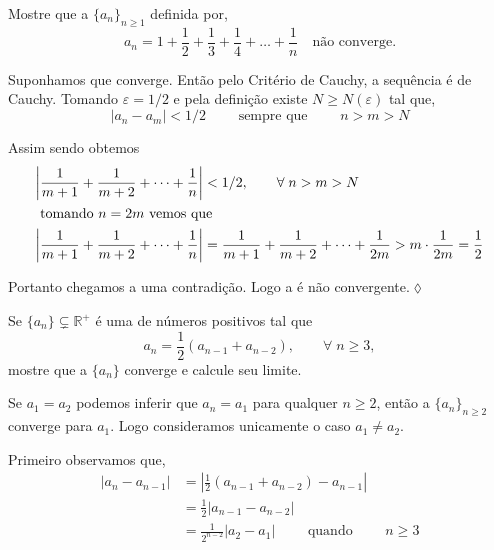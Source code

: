 \begin{exer}
Mostre que a \seq $\{a_n\}_{n\geq 1}$ definida por,
\begin{equation*}
a_n=1+\frac{1}{2}+\frac{1}{3}+\frac{1}{4}+\ldots+\frac{1}{n} \quad \text{n\~{a}o converge.}
\end{equation*}

\end{exer}

\solo Suponhamos que converge. Ent\~{a}o  pelo Crit\'{e}rio de Cauchy, a
sequ\^{e}ncia \'{e} de Cauchy. Tomando $\varepsilon=1/2$ e pela defini\c{c}\~{a}o existe $N\geq N(\varepsilon)$ tal que,
\begin{equation*}
  |a_n-a_m|<1/2\qquad \text{ sempre que }\qquad  n>m>N
\end{equation*}

 Assim sendo obtemos
\begin{align*}
\left|\frac{1}{m+1}+\frac{1}{m+2}+\cdots+\frac{1}{n}\right| &< 1/2,\qquad \forall \; n>m>N\\
   \intertext{ tomando $n=2m$ vemos que }
\left|\frac{1}{m+1}+\frac{1}{m+2}+\cdots+\frac{1}{n}\right|
&=\frac{1}{m+1}+\frac{1}{m+2}+\cdots+\frac{1}{2m}>m\cdot\frac{1}{2m}=\frac{1}{2}
\end{align*}

Portanto chegamos a uma contradi\c{c}\~{a}o. Logo a \seq  \'{e} n\~{a}o
convergente.\hfill \(\lozenge\)

\begin{exer}
Se $\{a_n\}\subsetneq \mathbb{R}^{+}$ \'{e} uma \seq de n\'{u}meros positivos
tal que
\begin{equation*}
  a_n=\frac{1}{2}(a_{n-1}+a_{n-2}), \qquad \forall\; n\geq 3,
\end{equation*}
mostre que a \seq $\{a_n\}$ converge e calcule seu limite.
\end{exer}

\solo Se $a_1=a_2$ podemos inferir que $a_n=a_1$ para qualquer
$n\geq 2$, ent\~{a}o a \seq $\{a_n\}_{n\geq 2}$ converge para $a_1$.
Logo consideramos unicamente o caso $a_1\neq a_2$.

Primeiro observamos que,
\begin{align}
 |a_n-a_{n-1}| &=\left|\frac{1}{2}(a_{n-1}+a_{n-2})-a_{n-1}\right|\nonumber \\[2ex]
  &=\frac{1}{2}\left|a_{n-1}-a_{n-2}\right|\nonumber\\[2ex]
  &=\frac{1}{2^{n-2}}|a_2-a_1|\qquad \text{ quando }\qquad n\geq
  3\label{ecau1}
\end{align}

